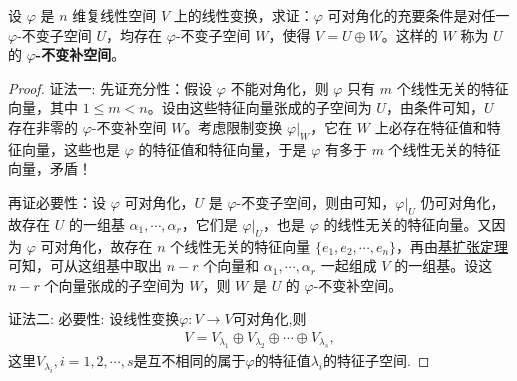 \documentclass[../../main.tex]{subfiles}%
\begin{document}
\begin{proposition}\label{proposition:线性变换可对角化的关于不变子空间的充要条件}
设 $\varphi$ 是 $n$ 维复线性空间 $V$ 上的线性变换，求证：$\varphi$ 可对角化的充要条件是对任一 $\varphi$-不变子空间 $U$，均存在 $\varphi$-不变子空间 $W$，使得 $V = U\oplus W$。这样的 $W$ 称为 $U$ 的 \textbf{$\varphi$-不变补空间}。
\end{proposition}
\begin{proof}

{\color{blue}证法一:}
{\heiti 先证充分性：}假设 $\varphi$ 不能对角化，则 $\varphi$ 只有 $m$ 个线性无关的特征向量，其中 $1\leqslant  m < n$。设由这些特征向量张成的子空间为 $U$，由条件可知，$U$ 存在非零的 $\varphi$-不变补空间 $W$。考虑限制变换 $\varphi|_W$，它在 $W$ 上必存在特征值和特征向量，这些也是 $\varphi$ 的特征值和特征向量，于是 $\varphi$ 有多于 $m$ 个线性无关的特征向量，矛盾！

{\heiti 再证必要性：}设 $\varphi$ 可对角化，$U$ 是 $\varphi$-不变子空间，则由可知，$\varphi|_U$ 仍可对角化，故存在 $U$ 的一组基 $\alpha_1,\cdots,\alpha_r$，它们是 $\varphi|_U$，也是 $\varphi$ 的线性无关的特征向量。又因为 $\varphi$ 可对角化，故存在 $n$ 个线性无关的特征向量 $\{e_1,e_2,\cdots,e_n\}$，再由\hyperref[theorem:基扩张定理]{基扩张定理}可知，可从这组基中取出 $n - r$ 个向量和 $\alpha_1,\cdots,\alpha_r$ 一起组成 $V$ 的一组基。设这 $n - r$ 个向量张成的子空间为 $W$，则 $W$ 是 $U$ 的 $\varphi$-不变补空间。

{\color{blue}证法二:}
{\heiti 必要性:}
设线性变换$\varphi: V \rightarrow V$可对角化,则
\begin{align}
V = V_{\lambda_1} \oplus V_{\lambda_2} \oplus \cdots \oplus V_{\lambda_s}, \label{eq:23.106}
\end{align}
这里$V_{\lambda_i}, i = 1,2,\cdots,s$是互不相同的属于$\varphi$的特征值$\lambda_i$的特征子空间.


\end{proof}
\end{document}
